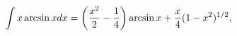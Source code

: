 \[\int x\mathop{\mathrm{arcsin}\/}\nolimits xdx=\left(\frac{x^{2}}{2}-\frac{1}{4%
}\right)\mathop{\mathrm{arcsin}\/}\nolimits x+\frac{x}{4}(1-x^{2})^{1/2},\]